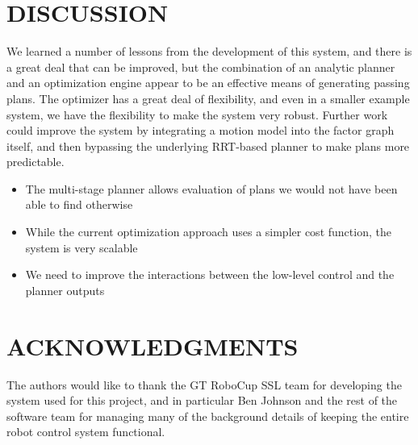 \documentclass[a4paper, 10pt, conference]{ieeeconf}      %
\begin{document}
\section{DISCUSSION}
We learned a number of lessons from the development of this system, and there is a great deal that can be improved, but the combination of an analytic planner and an optimization engine appear to be an effective means of generating passing plans.  The optimizer has a great deal of flexibility, and even in a smaller example system, we have the flexibility to make the system very robust.  Further work could improve the system by integrating a motion model into the factor graph itself, and then bypassing the underlying RRT-based planner to make plans more predictable. 
\begin{itemize}
\item The multi-stage planner allows evaluation of plans we would not have been able to find otherwise
\item While the current optimization approach uses a simpler cost function, the system is very scalable
\item We need to improve the interactions between the low-level control and the planner outputs
\end{itemize}



\section{ACKNOWLEDGMENTS}

The authors would like to thank the GT RoboCup SSL team for developing the system used for this project, and in particular Ben Johnson and the rest of the software team for managing many of the background details of keeping the entire robot control system functional. 




% 
% 
% 
% 
\end{document}
